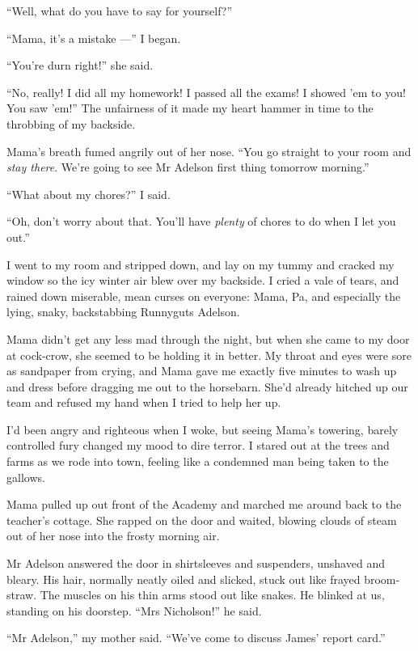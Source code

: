 ``Well, what do you have to say for yourself?''

``Mama, it's a mistake ---'' I began.

``You're durn right!'' she said.

``No, really! I did all my homework! I passed all the exams! I showed 'em to 
you! You saw 'em!''
The unfairness of it made my heart hammer in time to the throbbing
of my backside.

Mama's breath fumed angrily out of her nose.
``You go straight to your room and \emph{stay there}. We're going to see Mr 
Adelson first thing tomorrow morning.''

``What about my chores?'' I said.

``Oh, don't worry about that. You'll have \emph{plenty} of chores to do when I 
let you out.''

I went to my room and stripped down, and lay on my tummy and
cracked my window so the icy winter air blew over my backside. I
cried a vale of tears, and rained down miserable, mean curses on
everyone: Mama, Pa, and especially the lying, snaky, backstabbing
Runnyguts Adelson.

\tb

Mama didn't get any less mad through the night, but when she came
to my door at cock-crow, she seemed to be holding it in better. My
throat and eyes were sore as sandpaper from crying, and Mama gave
me exactly five minutes to wash up and dress before dragging me out
to the horsebarn. She'd already hitched up our team and refused my
hand when I tried to help her up.

I'd been angry and righteous when I woke, but seeing Mama's
towering, barely controlled fury changed my mood to dire terror. I
stared out at the trees and farms as we rode into town, feeling
like a condemned man being taken to the gallows.

Mama pulled up out front of the Academy and marched me around back
to the teacher's cottage. She rapped on the door and waited,
blowing clouds of steam out of her nose into the frosty morning
air.

Mr Adelson answered the door in shirtsleeves and suspenders,
unshaved and bleary. His hair, normally neatly oiled and slicked,
stuck out like frayed broom-straw. The muscles on his thin arms
stood out like snakes. He blinked at us, standing on his doorstep.
``Mrs Nicholson!'' he said.

``Mr Adelson,'' my mother said.
``We've come to discuss James' report card.''

